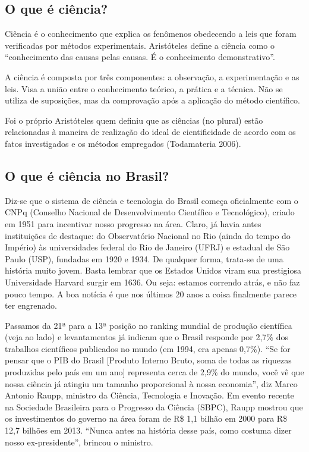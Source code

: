 \documentclass[]{article}
\begin{document}
\hypertarget{o-que-uxe9-ciuxeancia}{%
\subsection{O que é ciência?}\label{o-que-uxe9-ciuxeancia}}

Ciência é o conhecimento que explica os fenômenos obedecendo a leis que
foram verificadas por métodos experimentais. Aristóteles define a
ciência como o ``conhecimento das causas pelas causas. É o conhecimento
demonstrativo''.

A ciência é composta por três componentes: a observação, a
experimentação e as leis. Visa a união entre o conhecimento teórico, a
prática e a técnica. Não se utiliza de suposições, mas da comprovação
após a aplicação do método científico.

Foi o próprio Aristóteles quem definiu que as ciências (no plural) estão
relacionadas à maneira de realização do ideal de cientificidade de
acordo com os fatos investigados e os métodos empregados (Todamateria
2006).

\hypertarget{o-que-uxe9-ciuxeancia-no-brasil}{%
\subsection{O que é ciência no
Brasil?}\label{o-que-uxe9-ciuxeancia-no-brasil}}

Diz-se que o sistema de ciência e tecnologia do Brasil começa
oficialmente com o CNPq (Conselho Nacional de Desenvolvimento Científico
e Tecnológico), criado em 1951 para incentivar nosso progresso na área.
Claro, já havia antes instituições de destaque: do Observatório Nacional
no Rio (ainda do tempo do Império) às universidades federal do Rio de
Janeiro (UFRJ) e estadual de São Paulo (USP), fundadas em 1920 e 1934.
De qualquer forma, trata-se de uma história muito jovem. Basta lembrar
que os Estados Unidos viram sua prestigiosa Universidade Harvard surgir
em 1636. Ou seja: estamos correndo atrás, e não faz pouco tempo. A boa
notícia é que nos últimos 20 anos a coisa finalmente parece ter
engrenado.

Passamos da 21ª para a 13ª posição no ranking mundial de produção
científica (veja ao lado) e levantamentos já indicam que o Brasil
responde por 2,7\% dos trabalhos científicos publicados no mundo (em
1994, era apenas 0,7\%). ``Se for pensar que o PIB do Brasil {[}Produto
Interno Bruto, soma de todas as riquezas produzidas pelo país em um
ano{]} representa cerca de 2,9\% do mundo, você vê que nossa ciência já
atingiu um tamanho proporcional à nossa economia'', diz Marco Antonio
Raupp, ministro da Ciência, Tecnologia e Inovação. Em evento recente na
Sociedade Brasileira para o Progresso da Ciência (SBPC), Raupp mostrou
que os investimentos do governo na área foram de R\$ 1,1 bilhão em 2000
para R\$ 12,7 bilhões em 2013. ``Nunca antes na história desse país,
como costuma dizer nosso ex-presidente'', brincou o ministro.
\end{document}

